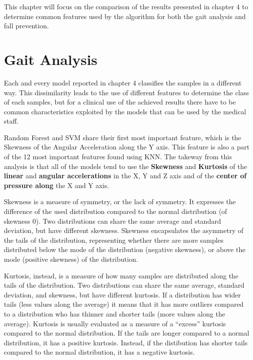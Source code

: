 
This chapter will focus on the comparison of the results presented in chapter 4 to determine common features used by the algorithm for both the gait analysis and fall prevention.


\section{Gait Analysis}

Each and every model reported in chapter 4 classifies the samples in a different way. This dissimilarity leads to the use of different features to determine the class of each samples, but for a clinical use of the achieved results there have to be common characteristics exploited by the models that can be used by the medical staff.

Random Forest and SVM share their first most important feature, which is the Skewness of the Angular Acceleration along the Y axis. This feature is also a part of the 12 most important features found using KNN.
The takeway from this analysis is that all of the models tend to use the \textbf{Skewness} and \textbf{Kurtosis} of the \textbf{linear} and \textbf{angular accelerations} in the X, Y and Z axis and of the \textbf{center of pressure along} the X and Y axis.

Skewness is a measure of symmetry, or the lack of symmetry. It expresses the difference of the used distribution compared to the normal distribution (of skewness 0). Two distributions can share the same average and standard deviation, but have different skewness. Skewness encapsulates the asymmetry of the tails of the distribution, representing whether there are more samples distributed below the mode of the distribution (negative skewness), or above the mode (positive skewness) of the distribution.

Kurtosis, instead, is a measure of how many samples are distributed along the tails of the distribution. Two distributions can share the same average, standard deviation, and skewness, but have different kurtosis.
If a distribution has wider tails (less values along the average) it means that it has more outliers compared to a distribution who has thinner and shorter tails (more values along the average). Kurtosis is usually evaluated as a measure of a \enquote{excess} kurtosis compared to the normal distribution. If the tails are longer compared to a normal distribution, it has a positive kurtosis. Instead, if the distibution has shorter tails compared to the normal distribution, it has a negative kurtosis.

